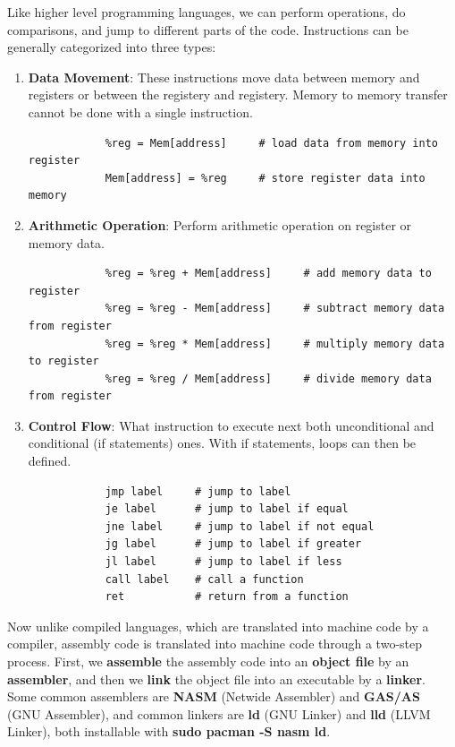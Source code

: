 \documentclass{article}
\begin{document}
      Like higher level programming languages, we can perform operations, do comparisons, and jump to different parts of the code. Instructions can be generally categorized into three types: 
      \begin{enumerate} 
        \item \textbf{Data Movement}: These instructions move data between memory and registers or between the registery and registery. Memory to memory transfer cannot be done with a single instruction. 
          \begin{lstlisting} 
            %reg = Mem[address]     # load data from memory into register
            Mem[address] = %reg     # store register data into memory
          \end{lstlisting}
        \item \textbf{Arithmetic Operation}: Perform arithmetic operation on register or memory data. 
          \begin{lstlisting} 
            %reg = %reg + Mem[address]     # add memory data to register
            %reg = %reg - Mem[address]     # subtract memory data from register
            %reg = %reg * Mem[address]     # multiply memory data to register
            %reg = %reg / Mem[address]     # divide memory data from register
          \end{lstlisting}
        \item \textbf{Control Flow}: What instruction to execute next both unconditional and conditional (if statements) ones. With if statements, loops can then be defined. 
          \begin{lstlisting} 
            jmp label     # jump to label
            je label      # jump to label if equal
            jne label     # jump to label if not equal
            jg label      # jump to label if greater
            jl label      # jump to label if less
            call label    # call a function
            ret           # return from a function
          \end{lstlisting}
      \end{enumerate}

      Now unlike compiled languages, which are translated into machine code by a compiler, assembly code is translated into machine code through a two-step process. First, we \textbf{assemble} the assembly code into an \textbf{object file} by an \textbf{assembler}, and then we \textbf{link} the object file into an executable by a \textbf{linker}. Some common assemblers are \textbf{NASM} (Netwide Assembler) and \textbf{GAS/AS} (GNU Assembler), and common linkers are \textbf{ld} (GNU Linker) and \textbf{lld} (LLVM Linker), both installable with \textbf{sudo pacman -S nasm ld}. 
\end{document}
